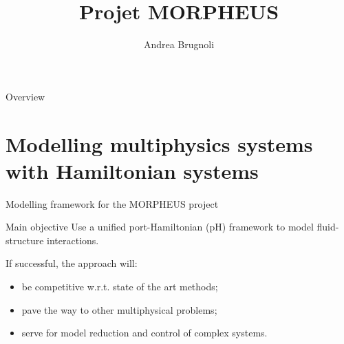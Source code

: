 \documentclass{beamer}
\title{Projet MORPHEUS}
\author{Andrea Brugnoli}
\begin{document}
\begin{frame}[plain]
    \maketitle
\end{frame}

\begin{frame}{Overview}
	\tableofcontents
\end{frame}

\section{Modelling multiphysics systems with Hamiltonian systems}

\begin{frame}{Modelling framework for the MORPHEUS project}
	
	\begin{block}{Main objective}
		Use a unified port-Hamiltonian (pH) framework to model fluid-structure interactions.
	\end{block}
	
	If successful, the approach will: 
	\begin{itemize}
		\item be competitive w.r.t. state of the art methods;
		\item pave the way to other multiphysical problems;
		\item serve for model reduction and control of complex systems.
	\end{itemize}
	

\end{frame}
\end{document}
